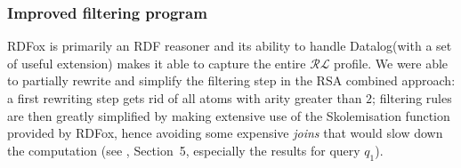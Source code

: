 \documentclass[runningheads]{llncs}
\newcommand{\rdfox}{\mbox{RDFox}\xspace}
\newcommand{\datalog}{\mbox{Datalog}\xspace}
\begin{document}
\subsubsection{Improved filtering program}\label{sssec:improved_filtering_program}

\rdfox is primarily an RDF reasoner and its ability to handle \datalog (with a set of useful extension) makes it able to capture the entire $\mathcal{RL}$ profile.
We were able to partially rewrite and simplify the filtering step in the RSA combined approach:
a first rewriting step gets rid of all atoms with arity greater than $2$;
filtering rules are then greatly simplified by making extensive use of the Skolemisation function provided by \rdfox, hence avoiding some expensive \emph{joins} that would slow down the computation (see \cite{feier2015}, Section~5, especially the results for query $q_1$).
\end{document}
